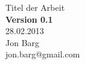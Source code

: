 \begin{titlepage}
	\vspace*{7cm}
	\begin{center}
		\Huge
		Titel der Arbeit\\
		\vspace{1cm}
		\large
		\textbf{Version 0.1}\\
		28.02.2013\\
		\vspace{2cm}
		Jon Barg \\
		jon.barg@gmail.com
	\end{center}
	\normalsize
	\vfill
	
	
\end{titlepage}

\tableofcontents




%
%
